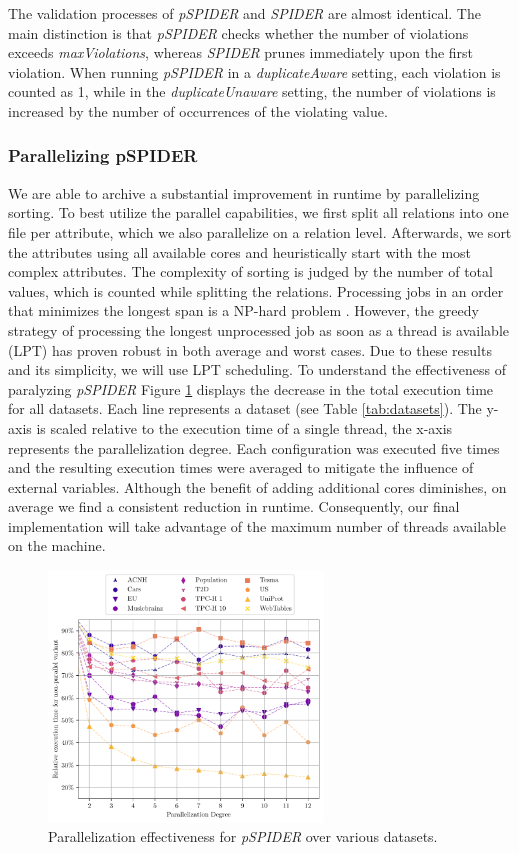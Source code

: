 The validation processes of \textit{pSPIDER} and \textit{SPIDER} are almost identical. The main distinction is that \textit{pSPIDER} checks whether the number of violations exceeds \textit{maxViolations}, whereas \textit{SPIDER} prunes immediately upon the first violation. When running \textit{pSPIDER} in a \textit{duplicateAware} setting, each violation is counted as 1, while in the \textit{duplicateUnaware} setting, the number of violations is increased by the number of occurrences of the violating value.

\subsubsection{\textbf{Parallelizing pSPIDER}}
We are able to archive a substantial improvement in runtime by parallelizing sorting. To best utilize the parallel capabilities, we first split all relations into one file per attribute, which we also parallelize on a relation level. Afterwards, we sort the attributes using all available cores and heuristically start with the most complex attributes. The complexity of sorting is judged by the number of total values, which is counted while splitting the relations. Processing jobs in an order that minimizes the longest span is a NP-hard problem \cite{graham1979optimization}. However, the greedy strategy of processing the longest unprocessed job as soon as a thread is available (LPT) has proven robust in both average and worst cases. Due to these results and its simplicity, we will use LPT scheduling. To understand the effectiveness of paralyzing \textit{pSPIDER} Figure \ref{fig:parallel_spider} displays the decrease in the total execution time for all datasets. Each line represents a dataset (see Table \ref{tab:datasets}). The y-axis is scaled relative to the execution time of a single thread, the x-axis represents the parallelization degree. Each configuration was executed five times and the resulting execution times were averaged to mitigate the influence of external variables. Although the benefit of adding additional cores diminishes, on average we find a consistent reduction in runtime. Consequently, our final implementation will take advantage of the maximum number of threads available on the machine.

\begin{figure}
    \centering
    \includegraphics[width=0.65\textwidth]{figures/spider_parallel.pdf}
    \caption{Parallelization effectiveness for \textit{pSPIDER} over various datasets.}
    \label{fig:parallel_spider}
\end{figure}